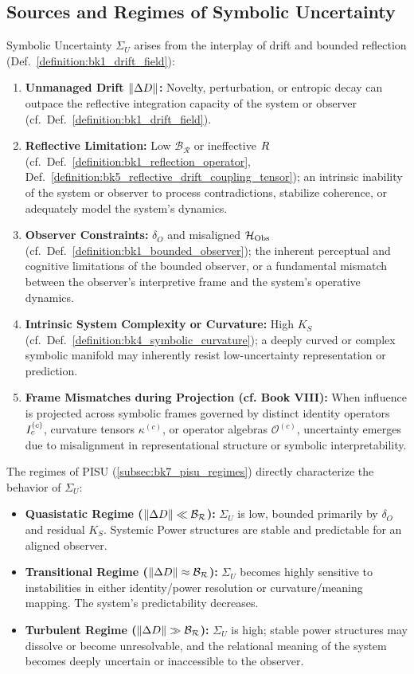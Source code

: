 \subsection{Sources and Regimes of Symbolic Uncertainty}
\label{subsec:bk7_sources_regimes_uncertainty}
Symbolic Uncertainty \(\Sigma_U\) arises from the interplay of drift and
bounded reflection (Def.~\ref{definition:bk1_drift_field}):
\begin{enumerate}
    \item \textbf{Unmanaged Drift \(\|\Delta D\|\):} Novelty, perturbation,
    or entropic decay can outpace the reflective integration capacity of the
    system or observer (cf.~Def.~\ref{definition:bk1_drift_field}).
    \item \textbf{Reflective Limitation:} Low \(\mathcal{B_R}\) or ineffective \(R\) (cf.~Def.~\ref{definition:bk1_reflection_operator}, Def.~\ref{definition:bk5_reflective_drift_coupling_tensor}); an intrinsic inability of the system or observer to process contradictions, stabilize coherence, or adequately model the system's dynamics.
    \item \textbf{Observer Constraints:} \(\delta_O\) and misaligned \(\mathcal{H}_{\mathrm{Obs}}\) (cf.~Def.~\ref{definition:bk1_bounded_observer}); the inherent perceptual and cognitive limitations of the bounded observer, or a fundamental mismatch between the observer's interpretive frame and the system's operative dynamics.
    \item \textbf{Intrinsic System Complexity or Curvature:} High \(K_S\) (cf.~Def.~\ref{definition:bk4_symbolic_curvature}); a deeply curved or complex symbolic manifold may inherently resist low-uncertainty representation or prediction.
    \item \textbf{Frame Mismatches during Projection (cf. Book VIII):} When influence is projected across symbolic frames governed by distinct identity operators \(I_c^{(c)}\), curvature tensors \(\kappa^{(c)}\), or operator algebras \(\mathcal{O}^{(c)}\), uncertainty emerges due to misalignment in representational structure or symbolic interpretability.
\end{enumerate}
The regimes of PISU (\ref{subsec:bk7_pisu_regimes}) directly characterize the behavior of \(\Sigma_U\):
\begin{itemize}
    \item \textbf{Quasistatic Regime (\(\|\Delta D\| \ll \mathcal{B_R}\)):} \(\Sigma_U\) is low, bounded primarily by \(\delta_O\) and residual \(K_S\). Systemic Power structures are stable and predictable for an aligned observer.
    \item \textbf{Transitional Regime (\(\|\Delta D\| \approx \mathcal{B_R}\)):} \(\Sigma_U\) becomes highly sensitive to instabilities in either identity/power resolution or curvature/meaning mapping. The system's predictability decreases.
    \item \textbf{Turbulent Regime (\(\|\Delta D\| \gg \mathcal{B_R}\)):} \(\Sigma_U\) is high; stable power structures may dissolve or become unresolvable, and the relational meaning of the system becomes deeply uncertain or inaccessible to the observer.
\end{itemize}

